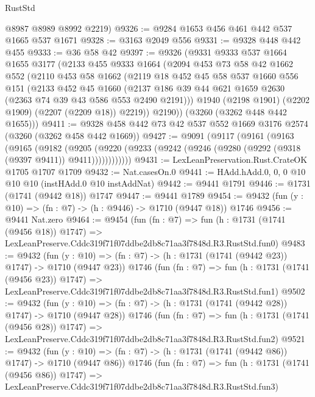 \begin{lexlean}{RustStd}
\begin{coremodule}
      @8987
      @8989
      @8992
      @2219)
@9326 := @9284 @1653 @456 @461 @442 @537 @1665 @537 @1671
@9328 := @3163 @2049 @556
@9331 := @9328 @448 @442 @455
@9333 := @36 @58 @42
@9397 := @9326
    (@9331
      @9333
      @537
      @1664
      @1655
      @3177
      (@2133
        @455
        @9333
        @1664
        (@2094
          @453
          @73
          @58
          @42
          @1662
          @552
          (@2110
            @453
            @58
            @1662
            (@2119
              @18
              @452
              @45
              @58
              @537
              @1660
              @556
              @151
              (@2133
                @452
                @45
                @1660
                (@2137 @186 @39 @44 @621 @1659 @2630 (@2363 @74 @39 @43 @586 @553 @2490 @2191)))
              @1940
              (@2198 @1901)
              (@2202 @1909)
              (@2207 (@2209 @18))
              @2219))
          @2190))
      (@3260 (@3262 @448 @442 @1655)))
@9411 := @9328 @458 @442 @73 @42 @537 @552 @1669 @3176 @2574 (@3260 (@3262 @458 @442 @1669))
@9427 := @9091
    (@9117
      (@9161
        (@9163
          (@9165
            (@9182
              (@9205
                (@9220 (@9233 (@9242 (@9246 (@9280 (@9292 (@9318 (@9397 @9411)) @9411))))))))))))
@9431 := LexLeanPreservation.Rust.CrateOK @1705 @1707 @1709
@9432 := Nat.casesOn.{0}
@9441 := HAdd.hAdd.{0, 0, 0} @10 @10 @10 (instHAdd.{0} @10 instAddNat)
@9442 := @9441 @1791
@9446 := @1731 (@1741 (@9442 @18)) @1747
@9447 := @9441 @1789
@9454 := @9432 (fun (y : @10) => (fn : @7) -> (h : @9446) -> @1710 (@9447 @18)) @1746
@9456 := @9441 Nat.zero
@9464 := @9454
    (fun (fn : @7) =>
    fun (h : @1731 (@1741 (@9456 @18)) @1747) =>
    LexLeanPreserve.Cddc319f71f07ddbe2db8c71aa3f7848d.R3.RustStd.fun0)
@9483 := @9432
    (fun (y : @10) => (fn : @7) -> (h : @1731 (@1741 (@9442 @23)) @1747) -> @1710 (@9447 @23))
    @1746
    (fun (fn : @7) =>
    fun (h : @1731 (@1741 (@9456 @23)) @1747) =>
    LexLeanPreserve.Cddc319f71f07ddbe2db8c71aa3f7848d.R3.RustStd.fun1)
@9502 := @9432
    (fun (y : @10) => (fn : @7) -> (h : @1731 (@1741 (@9442 @28)) @1747) -> @1710 (@9447 @28))
    @1746
    (fun (fn : @7) =>
    fun (h : @1731 (@1741 (@9456 @28)) @1747) =>
    LexLeanPreserve.Cddc319f71f07ddbe2db8c71aa3f7848d.R3.RustStd.fun2)
@9521 := @9432
    (fun (y : @10) => (fn : @7) -> (h : @1731 (@1741 (@9442 @86)) @1747) -> @1710 (@9447 @86))
    @1746
    (fun (fn : @7) =>
    fun (h : @1731 (@1741 (@9456 @86)) @1747) =>
    LexLeanPreserve.Cddc319f71f07ddbe2db8c71aa3f7848d.R3.RustStd.fun3)

\end{coremodule}
\end{lexlean}

